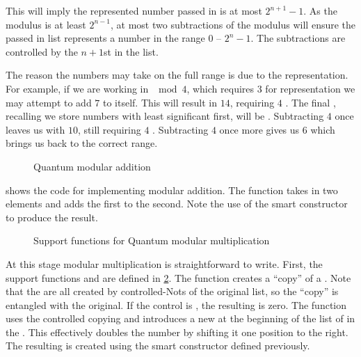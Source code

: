 This will imply the represented number passed in is at most $2^{n+1} -1$. As
the modulus is at least $2^{n-1}$, at most two subtractions of the 
modulus will ensure the passed in list represents a number in the range
$0$ -- $2^n - 1$. The subtractions are controlled by the $n+1$st \qubit{}
in the list. 

The reason the numbers may take on the full range is due to the representation.
For example, if we are working in $\mod{4}$, which requires $3$ \qubits{}
 for representation we may attempt to add $7$ to itself. This will 
result in $14$, requiring $4$ \qubits. The final \qubit, recalling we store
numbers with least significant \qubit{} first, will be . Subtracting
$4$ once leaves us with $10$, still requiring $4$ \qubits. Subtracting $4$
once more gives us $6$ which brings us back to the correct range.


\begin{figure}[htbp]

\caption{Quantum modular addition}\label{fig:quantummodularadd}
\end{figure}

 shows the \lqpl{} code for implementing
modular addition. The function  takes in two 
 elements and adds the first to the second. Note the
use of the smart constructor  to produce the result.


\begin{figure}[htbp]

\caption{Support functions for Quantum modular multiplication}\label{fig:quantummodularmultsupport}
\end{figure}

At this stage modular multiplication is straightforward to write. 
First, the support functions  and  are
defined  in \ref{fig:quantummodularmultsupport}. 
The  function
creates a ``copy'' of a . Note that the \qubits
are all created by controlled-Nots of the original list, so the
``copy'' is entangled with the original. If the control \qubit{} is
, the resulting  is zero. The 
function uses the controlled copying and introduces a new  at the
beginning of the list of \qubits{} in the . This
effectively doubles the number by shifting it one position to the right.
The resulting  is created using the smart constructor 
defined previously.



